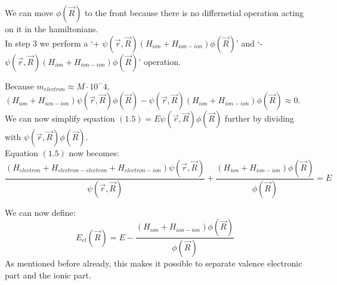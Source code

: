 We can move $\phi(\vec{R})$ to the front because there is no differnetial operation acting on it in the hamiltonians.\\
In step 3 we perform a `+ $\psi(\vec{r}, \vec{R})(H_{ion} + H_{ion - ion})\phi(\vec{R})$' and `- $\psi(\vec{r}, \vec{R})(H_{ion} + H_{ion - ion})\phi(\vec{R})$' operation. \par
Because $m_{electron} \approx M \cdot 10^-4$, $(H_{ion} + H_{ion - ion})\psi(\vec{r}, \vec{R})\phi(\vec{R}) - \psi(\vec{r}, \vec{R})(H_{ion} + H_{ion - ion})\phi(\vec{R}) \approx 0$.
We can now simplify equation $ (1.5) = E\psi(\vec{r}, \vec{R})\phi(\vec{R}) $ further by dividing with $ \psi(\vec{r}, \vec{R})\phi(\vec{R}) $. \\
Equation $(1.5)$ now becomes:
\begin{equation}
	\frac{(H_{electron} + H_{electron - electron} + H_{electron - ion})\psi(\vec{r}, \vec{R})}{\psi(\vec{r}, \vec{R})} + \frac{(H_{ion} + H_{ion - ion})\phi(\vec{R})}{\phi(\vec{R})} = E
\end{equation}
 \par
We can now define:
\begin{equation}
	E_{el}(\vec{R}) = E - \frac{(H_{ion} + H_{ion - ion})\phi(\vec{R})}{\phi(\vec{R})}
\end{equation}
As mentioned before already, this makes it possible to separate valence electronic part and the ionic part.
